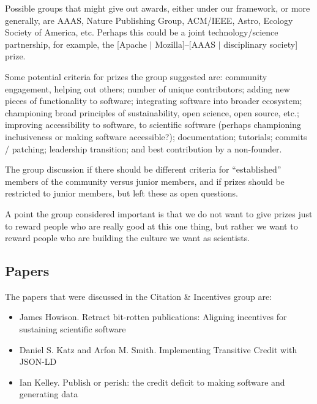 \documentclass[11pt, oneside]{amsart}
\begin{document}
Possible groups that might give out awards, either under our framework, or more generally,
are AAAS, Nature Publishing Group, ACM/IEEE, Astro, Ecology
Society of America, etc. Perhaps this could be a joint technology/science
partnership, for example, the [Apache $|$ Mozilla]--[AAAS $|$ disciplinary
society] prize.

Some potential criteria for prizes the group suggested are:
community engagement, helping out others;
number of unique contributors;
adding new pieces of functionality to software;
integrating software into broader ecosystem; championing broad principles of
sustainability, open science, open source, etc.;
improving accessibility to software, to scientific software (perhaps championing
inclusiveness or making software accessible?);
documentation;
tutorials;
commits / patching;
leadership transition; and
best contribution by a non-founder.

The group discussion if there should be different criteria for ``established''
members of the community versus junior members, and if prizes should be
restricted to junior members, but left these as open questions.

A point the group considered important is that we do not want to give prizes just
to reward people who are really good at this one thing, but rather we want to
reward people who are building the culture we want as scientists.





\subsection{Papers}
The papers that were discussed in the Citation \& Incentives group are:
\begin{itemize}
\item James Howison. Retract bit-rotten publications: Aligning incentives for
sustaining scientific software~\cite{wssspe2_howison}

\item Daniel S. Katz and Arfon M. Smith. Implementing Transitive Credit with
{JSON-LD}~\cite{wssspe2_katz}

\item Ian Kelley. Publish or perish: the credit deficit to making software and
generating data~\cite{wssspe2_kelley}
\end{itemize}
\end{document}
